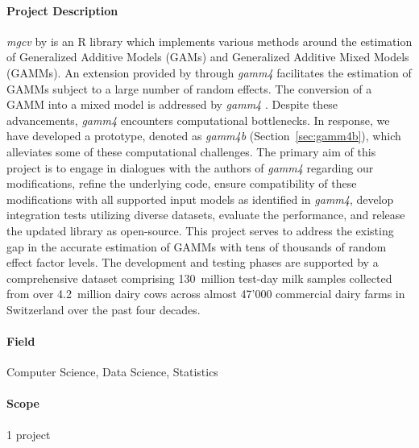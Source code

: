 \paragraph{Project Description} \textit{mgcv} by \cite{wood_generalized_2017} is an R library which implements various methods around the estimation of Generalized Additive Models (GAMs) and Generalized Additive Mixed Models (GAMMs). An extension provided by \cite{wood_gamm4_2020} through \textit{gamm4} facilitates the estimation of GAMMs subject to a large number of random effects. The conversion of a GAMM into a mixed model is addressed by \textit{gamm4} \citep{wood_stable_2004}. Despite these advancements, \textit{gamm4} encounters computational bottlenecks. In response, we have developed a prototype, denoted as \textit{gamm4b} (Section~\ref{sec:gamm4b}), which alleviates some of these computational challenges. The primary aim of this project is to engage in dialogues with the authors of \textit{gamm4} regarding our modifications, refine the underlying code, ensure compatibility of these modifications with all supported input models as identified in \textit{gamm4}, develop integration tests utilizing diverse datasets, evaluate the performance, and release the updated library as open-source. This project serves to address the existing gap in the accurate estimation of GAMMs with tens of thousands of random effect factor levels. The development and testing phases are supported by a comprehensive dataset comprising 130~million test-day milk samples collected from over 4.2~million dairy cows across almost 47'000 commercial dairy farms in Switzerland over the past four decades.

\paragraph{Field} Computer Science, Data Science, Statistics

\paragraph{Scope} 1 project

